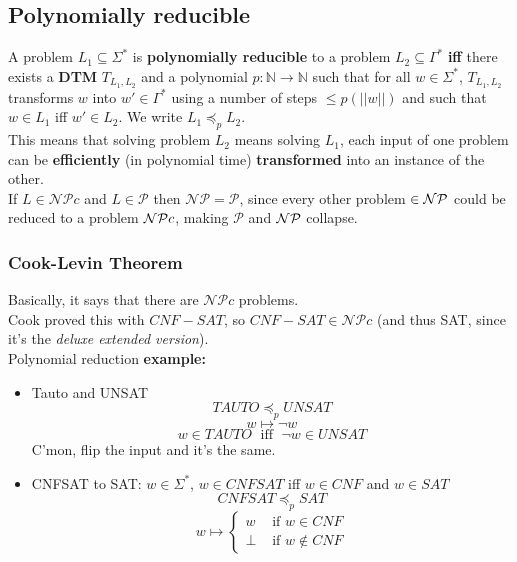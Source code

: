 \documentclass[11pt]{article}
\begin{document}
	\subsection{Polynomially reducible}
	
	A problem $L_1 \subseteq \Sigma^\ast$ is \textbf{polynomially reducible} to a problem $L_2 \subseteq \Gamma^\ast$ \textbf{iff} there exists a \textbf{DTM} $T_{L_1, L_2}$ and a polynomial $p : \mathbb{N} \rightarrow \mathbb{N}$ such that for all $w \in \Sigma^\ast$, $T_{L_1, L_2}$ transforms $w$ into $w' \in \Gamma^\ast$ using a number of steps $\leq p (||w||)$ and such that $w \in L_1$ iff $w' \in L_2$. We write $L_1 \preceq_p L_2$.\\
	
	This means that solving problem $L_2$ means solving $L_1$, each input of one problem can be \textbf{efficiently} (in polynomial time) \textbf{transformed} into an instance of the other.\\
	
	If $L \in \mathcal{NP}c$ and $L \in \mathcal{P}$ then $\mathcal{NP} = \mathcal{P}$, since every other problem $\in \mathcal{NP}$ could be reduced to a problem $\mathcal{NP} c$, making $\mathcal{P}$ and $\mathcal{NP}$ collapse.\\
	
	\newpage
	
	\subsubsection{Cook-Levin Theorem}
	
	Basically, it says that there are $\mathcal{NP}c$ problems.\\
	
	Cook proved this with $CNF-SAT$, so $CNF-SAT \in \mathcal{NP}c$ (and thus SAT, since it's the \textit{deluxe extended version}).\\
	
	Polynomial reduction \textbf{example:}
	\begin{itemize}
		\item Tauto and UNSAT
		$$ TAUTO \preceq_p UNSAT $$
		$$ w \mapsto \neg w $$
		$$ w \in TAUTO \; \text{ iff } \; \neg w \in UNSAT $$
		C'mon, flip the input and it's the same.\\
		
		\item CNFSAT to SAT: $w \in \Sigma^\ast$, $w \in CNFSAT$ iff $w \in CNF$ and $w \in SAT$
		$$ CNFSAT \preceq_p SAT $$
		$$ w \mapsto \begin{cases}
			w & \text{ if } w \in CNF \\
			\bot & \text{ if } w \notin CNF
		\end{cases}$$
		\nn
	\end{itemize}
	
\end{document}
